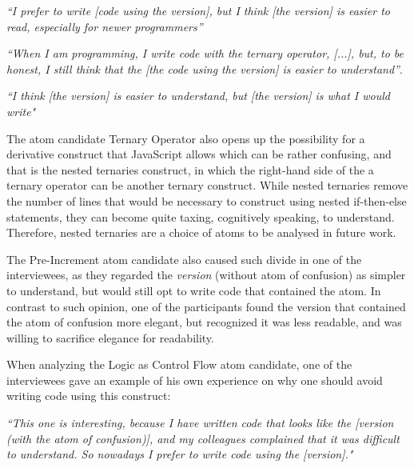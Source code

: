 \begin{mq}
\emph{``I prefer to write [code using the \lhs version], but I think [the \rhs version]  is easier to read, especially for newer programmers''}
\end{mq}

\begin{mq}
\emph{``When I am programming, I write code with the ternary operator, [...], but, to be honest, I still think that the [the code using the \lhs version] is easier to understand''}.
\end{mq}

\begin{mq}
\emph{``I think [the \lhs version] is easier to understand, but [the \rhs version] is what I would write"}
\end{mq}

The atom candidate Ternary Operator also opens up
the possibility for a derivative construct that JavaScript
allows which can be rather confusing, and that is the nested
ternaries construct, in which the right-hand side of the a
ternary operator can be another ternary construct.
While nested ternaries remove the number of lines that
would be necessary to construct using nested if-then-else statements,
they can become quite taxing, cognitively speaking, to understand.
Therefore, nested ternaries are a choice of atoms to be analysed in future work.

The Pre-Increment atom candidate also caused such
divide in one of the interviewees, as they
regarded the \emph{\rhs version} (without atom of confusion)
as simpler to understand, but would still opt to write
code that contained the atom. In contrast to such opinion,
one of the participants found the version that contained the atom
of confusion more elegant, but recognized it was less readable,
and was willing to sacrifice elegance for readability.


When analyzing the Logic as Control Flow atom candidate, one of
the interviewees gave an example of his own experience
on why one should avoid writing code using this construct:

\begin{mq}
  \emph{``This one is interesting, because I have written
  code that looks like the [\lhs version (with the atom of confusion)],
  and my colleagues complained that it was difficult to understand.
  So nowadays I prefer to write code using the [\rhs version]."}
\end{mq}

